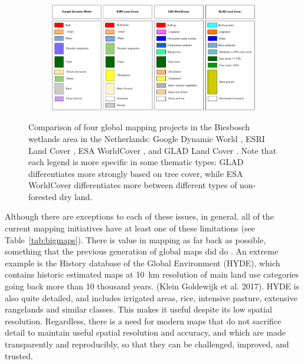 \begin{figure}[H]
\begin{subfigure}[t]{0.243\textwidth}
    \end{subfigure}
    
    \begin{subfigure}[b]{\textwidth}
        \centering
        \includegraphics[width=\textwidth]{figs_01/thesis_legends-harmonized.pdf}
    \end{subfigure}
    
    \caption{Comparison of four global mapping projects in the Biesbosch wetlands area in the Netherlands: Google Dynamic World \citep{brown2022dynamic}, ESRI Land Cover \citep{karra2021global}, ESA WorldCover \citep{zanaga2022esa}, and GLAD Land Cover \citep{potapov2022global}. Note that each legend is more specific in some thematic types: GLAD differentiates more strongly based on tree cover, while ESA WorldCover differentiates more between different types of non-forested dry land.}
    \label{fig:bigmaps_biesbosch}
\end{figure}


 
    Although there are exceptions to each of these issues, in general, all of the current mapping initiatives have at least one of these limitations (see Table\@~\ref{tab:bigmaps}). There is value in mapping as far back as possible, something that the previous generation of global maps did do \citep{garcia2022global}. An extreme example is the History database of the Global Environment (HYDE), which contains historic estimated maps at 10~km resolution of main land use categories going back more than 10 thousand years. (Klein Goldewijk et al. 2017). HYDE is also quite detailed, and includes irrigated areas, rice, intensive pasture, extensive rangelands and similar classes. This makes it useful despite its low spatial resolution. Regardless, there is a need for modern maps that do not sacrifice detail to maintain useful spatial resolution and accuracy, and which are made transparently and reproducibly, so that they can be challenged, improved, and trusted.

